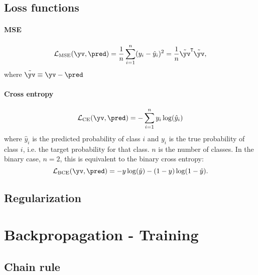     \subsection{Loss functions}
        \paragraph{MSE}
            \begin{equation}\label{eq:ML:NN:loss:MSE}
                \mathcal{L}_\mathrm{MSE}(\yv, \pred) = \frac{1}{n}\sum_{i=1}^n(y_i-\hat{y}_i)^2 = \frac{1}{n}\tilde{\yv}^\mathtt{T}\tilde{\yv},
            \end{equation}
            where $\tilde{\yv} \equiv \yv-\pred$



        \paragraph{Cross entropy}
            \begin{equation}\label{eq:ML:NN:loss:cross_entropy}
                \mathcal{L}_\mathrm{CE}(\yv, \pred) = -\sum_{i=1}^n y_i\log(\hat{y}_i)
            \end{equation}
            where $\hat{y}_i$ is the predicted probability of class $i$ and $y_i$ is the true probability of class $i$, i.e. the target probability for that class. $n$ is the number of classes. In the binary case, $n=2$, this is equivalent to the binary cross entropy:
            \begin{equation}\label{eq:ML:NN:loss:binary_cross_entropy}
                \mathcal{L}_\mathrm{BCE}(\yv, \pred) = -y\log(\hat{y}) - (1-y)\log(1-\hat{y}).
            \end{equation}

    \subsection{Regularization} %

%
%
\section{Backpropagation - Training}
    \subsection{Chain rule}
